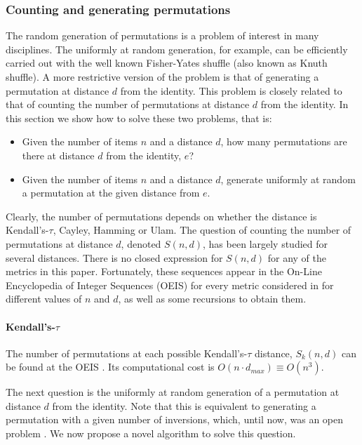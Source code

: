 \documentclass[article,nojss]{jss}
\begin{document}
\subsubsection{Counting and generating permutations}%
\label{sec:counting}
The random generation of permutations is  a problem of interest in many disciplines. The uniformly at random generation, for example, can be efficiently carried out with the well known Fisher-Yates shuffle (also known as Knuth shuffle). A more restrictive version of the problem is that of generating a permutation at distance $d$ from the identity. This problem is closely related to that of counting the number of permutations at distance $d$ from the identity. In this section we show how to solve these two problems, that is:
\begin{itemize}
\item Given the number of items $n$ and a distance $d$, how many permutations are there at distance $d$ from the identity, $e$?
\item Given the number of items $n$ and a distance $d$, generate uniformly at random a permutation at the given distance from $e$.
\end{itemize}

Clearly, the number of permutations depends on whether the distance is Kendall's-$\tau$, Cayley, Hamming or Ulam. The question of counting the number of permutations at distance $d$, denoted $S(n,d)$, has been largely studied for several distances. There is no closed expression for $S(n,d)$ for any of the metrics in this paper. Fortunately, these sequences appear in the On-Line Encyclopedia of Integer Sequences (OEIS) \citep{OEIS} for every metric  considered in  for different values of $n$ and $d$, as well as some recursions to obtain them. 

\paragraph{Kendall's-$\tau$}
The number of permutations at each possible Kendall's-$\tau$ distance, $S_k(n,d)$ can be found at the OEIS \citep{Sloane_kendall}. Its computational cost is $O(n \cdot d_{max}) \equiv O(n^3)$. 

The next question is the uniformly at random generation of a permutation at distance $d$ from the identity. Note that this is equivalent to generating a permutation with a given number of inversions, which, until now, was an open problem \citep{Arndt2010}. We now propose a novel algorithm to solve this question. 
\end{document}
